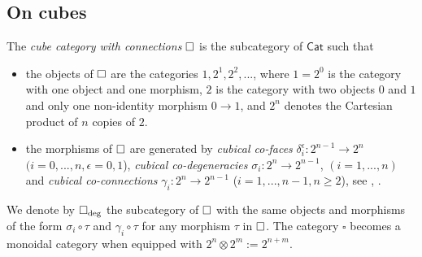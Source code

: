 
\subsection{On cubes}

The \textit{cube category with connections} $\square$ is the subcategory of $\mathsf{Cat}$ such that
\begin{itemize}
    \item the objects of $\square$ are the categories $1, 2^1, 2^2, ...$, where $1=2^0$ is the category with one object and one morphism, $2$ is the category with two objects $\mathfrak{0}$ and $\mathfrak{1}$ and only one non-identity morphism $\mathfrak{0}\to \mathfrak{1}$, and $2^n$ denotes the Cartesian product of $n$ copies of $2$.
    
    \item the morphisms of $\square$ are generated by  \textit{cubical co-faces} $\delta^{\epsilon}_i: 2^{n-1} \to 2^{n}$ $(i=0,...,n, \epsilon=0,1$), \textit{cubical co-degeneracies} $\sigma_i: 2^n \to 2^{n-1}$, $(i=1,...,n)$ and \textit{cubical co-connections} $\gamma_i: 2^n \to 2^{n-1}$ ($i=1,...,n-1, n\geq 2$), see \cite{Brown-Higgins}, \cite{rivera-zeinalian-cubical}. 
\end{itemize}
We denote by $\square_{\deg}$ the subcategory of $\square$ with the same objects and morphisms of the form $\sigma_i \circ \tau$ and $\gamma_i \circ \tau$ for any morphism $\tau$ in $\square$.  The category $\square$ becomes a monoidal category when equipped with $2^n \otimes 2^m := 2^{n+m}$. 


